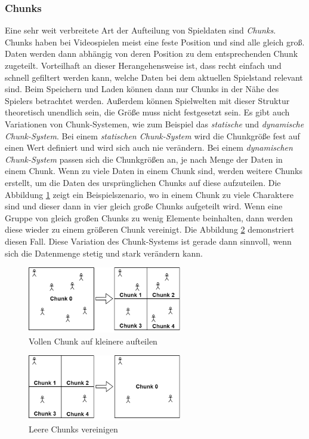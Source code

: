 \subsubsection{Chunks} \label{sssect:chunks}
Eine sehr weit verbreitete Art der Aufteilung von Spieldaten sind \textit{Chunks}. Chunks haben bei Videospielen meist eine feste Position und sind alle gleich groß. Daten werden dann abhängig von deren Position zu dem entsprechenden Chunk zugeteilt. Vorteilhaft an dieser Herangehensweise ist, dass recht einfach und schnell gefiltert werden kann, welche Daten bei dem aktuellen Spielstand relevant sind. Beim Speichern und Laden können dann nur Chunks in der Nähe des Spielers betrachtet werden. Außerdem können Spielwelten mit dieser Struktur theoretisch unendlich sein, die Größe muss nicht festgesetzt sein. Es gibt auch Variationen von Chunk-Systemen, wie zum Beispiel das \textit{statische} und \textit{dynamische Chunk-System}. Bei einem \textit{statischen Chunk-System} wird die Chunkgröße fest auf einen Wert definiert und wird sich auch nie verändern. Bei einem \textit{dynamischen Chunk-System} passen sich die Chunkgrößen an, je nach Menge der Daten in einem Chunk. Wenn zu viele Daten in einem Chunk sind, werden weitere Chunks erstellt, um die Daten des ursprünglichen Chunks auf diese aufzuteilen. Die Abbildung \ref{fig:chunkSplitting} zeigt ein Beispielszenario, wo in einem Chunk zu viele Charaktere sind und dieser dann in vier gleich große Chunks aufgeteilt wird. Wenn eine Gruppe von gleich großen Chunks zu wenig Elemente beinhalten, dann werden diese wieder zu einem größeren Chunk vereinigt. Die Abbildung \ref{fig:chunkJoining} demonstriert diesen Fall. Diese Variation des Chunk-Systems ist gerade dann sinnvoll, wenn sich die Datenmenge stetig und stark verändern kann. 

\begin{figure}[htp]
    \centering
    \includegraphics[width=0.6\textwidth]{images/chunkSplitting.png}
    \caption{Vollen Chunk auf kleinere aufteilen}
    \label{fig:chunkSplitting}
\end{figure}

\begin{figure}[htp]
    \centering
    \includegraphics[width=0.6\textwidth]{images/chunkJoining.png}
    \caption{Leere Chunks vereinigen}
    \label{fig:chunkJoining}
\end{figure}

